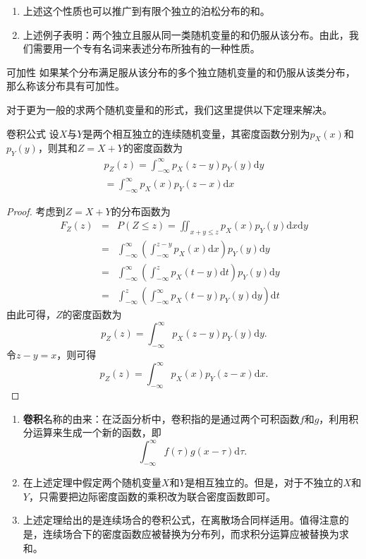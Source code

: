 \vspace{1cm}
\begin{remark}
\begin{enumerate}
    \item 上述这个性质也可以推广到有限个独立的泊松分布的和。
    \item 上述例子表明：两个独立且服从同一类随机变量的和仍服从该分布。由此，我们需要用一个专有名词来表述分布所独有的一种性质。
\end{enumerate}
\end{remark}

  \begin{definition}{可加性}
  如果某个分布满足服从该分布的多个独立随机变量的和仍服从该类分布，那么称该分布具有可加性。
  \end{definition}

对于更为一般的求两个随机变量和的形式，我们这里提供以下定理来解决。
\begin{theorem}{卷积公式}\label{def:convolution}
设$X$与$Y$是两个相互独立的连续随机变量，其密度函数分别为$p_X(x)$和$p_Y(y)$，则其和$Z = X+Y$的密度函数为
\begin{eqnarray*}
    p_Z(z) = \int_{-\infty}^{\infty} p_{X}(z-y) p_{Y}(y) \text{d} y  \\
    = \int_{-\infty}^{\infty} p_{X}(x) p_{Y}(z-x) \text{d} x
\end{eqnarray*}
\end{theorem}
\begin{proof}
     考虑到$Z = X+Y$的分布函数为
    \begin{eqnarray*}
         F_Z(z) &=& P(Z \leq z) = \iint_{x+y\leq z} p_{X}(x) p_Y(y) \text{d}x \text{d}y\\
         & = &\int_{-\infty}^{\infty} \left(\int_{-\infty}^{z-y} p_X(x)\text{d}x\right)p_Y(y)\text{d}y\\
         &=&\int_{-\infty}^{\infty} \left(\int_{-\infty}^{z} p_X(t-y)\text{d}t\right)p_Y(y)\text{d}y\\
         &=& \int_{-\infty}^{z} \left(\int_{-\infty}^{\infty} p_X(t-y) p_Y(y)\text{d}y\right)\text{d}t
    \end{eqnarray*}
   由此可得，$Z$的密度函数为
   $$
   p_Z(z) = \int_{-\infty}^{\infty} p_X(z-y) p_{Y}(y)\text{d}y.
   $$
   令$z-y=x$，则可得
   $$
    p_Z(z) = \int_{-\infty}^{\infty} p_{X}(x) p_{Y}(z-x) \text{d}x.
   $$
\end{proof}

  \begin{remark}
  \begin{enumerate}
      \item \textbf{卷积}名称的由来：在泛函分析中，卷积指的是通过两个可积函数$f$和$g$，利用积分运算来生成一个新的函数，即
      $$
      \int_{-\infty}^{\infty} f(\tau)g(x-\tau)\text{d} \tau.
      $$
      \item 在上述定理中假定两个随机变量$X$和$Y$是相互独立的。但是，对于不独立的$X$和$Y$，只需要把边际密度函数的乘积改为联合密度函数即可。
       \item 上述定理给出的是连续场合的卷积公式，在离散场合同样适用。值得注意的是，连续场合下的密度函数应被替换为分布列，而求积分运算应被替换为求和。
  \end{enumerate}
 \end{remark}

